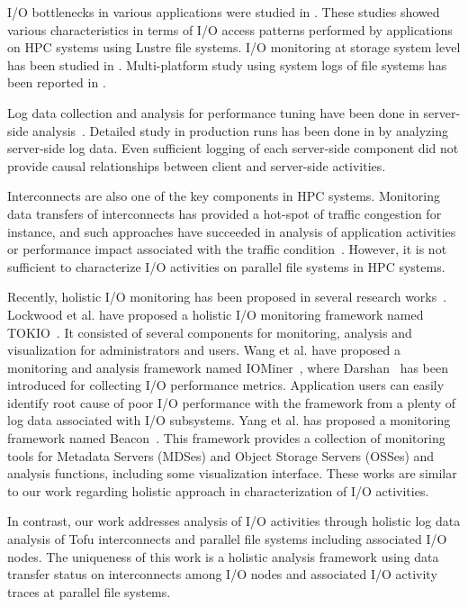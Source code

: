 \documentclass{jhps}
\begin{document}
I/O bottlenecks in various applications were studied in \cite{xie:sc12,saini:hipc12}.
These studies showed various characteristics in terms of I/O access patterns performed
by applications on HPC systems using Lustre file systems.
I/O monitoring at storage system level has been studied
in \cite{isc14:kunkel,uselton:cug13,madireddy:nas17}.
Multi-platform study using system logs of file systems has been reported
in \cite{luu:HPDC2015}.

Log data collection and analysis for performance tuning have been done in
server-side analysis~\cite{liu:fast2014,liu:sc16,xu:cug16}.
Detailed study in production runs has been done in \cite{patel:sc19}
by analyzing server-side log data.
Even sufficient logging of each server-side component did not provide causal relationships
between client and server-side activities.

Interconnects are also one of the key components in HPC systems. Monitoring data transfers of
interconnects has provided a hot-spot of traffic congestion for instance,
and such approaches have succeeded in analysis of application activities
or performance impact associated with
the traffic condition~\cite{zimmer:cug16,kumar:DSN2018,chunduri:pmbs19}.
However, it is not sufficient to characterize I/O activities on parallel file systems
in HPC systems.

Recently, holistic I/O monitoring has been proposed
in several research works~\cite{lockwood:cug18,wang:cluster18,yang:nsdi2019}.
Lockwood et al. have proposed a holistic I/O monitoring framework
named TOKIO~\cite{lockwood:cug18}.
It consisted of several components for monitoring, analysis and visualization
for administrators and users.
Wang et al. have proposed a monitoring and analysis framework
named IOMiner~\cite{wang:cluster18}, where Darshan~\cite{darshan:web}
has been introduced for collecting I/O performance metrics.
Application users can easily identify root cause of
poor I/O performance with the framework from a plenty of log data
associated with I/O subsystems.
Yang et al. has proposed a monitoring framework
named Beacon~\cite{yang:nsdi2019}.
This framework provides a collection of monitoring tools for Metadata Servers (MDSes)
and Object Storage Servers (OSSes) and analysis functions,
including some visualization interface. These works are similar to our work regarding
holistic approach in characterization of I/O activities.

In contrast, our work addresses analysis of I/O activities through holistic
log data analysis of Tofu interconnects and parallel file systems including
associated I/O nodes.
The uniqueness of this work is a holistic analysis framework using data transfer status
on interconnects among I/O nodes and associated I/O activity traces
at parallel file systems.
\end{document}
